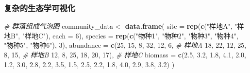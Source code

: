 \documentclass[
  twoside]{book}
\newenvironment{Shaded}{\begin{snugshade}}{\end{snugshade}}
\newcommand{\AttributeTok}[1]{\textcolor[rgb]{0.13,0.29,0.53}{#1}}
\newcommand{\CommentTok}[1]{\textcolor[rgb]{0.56,0.35,0.01}{\textit{#1}}}
\newcommand{\DecValTok}[1]{\textcolor[rgb]{0.00,0.00,0.81}{#1}}
\newcommand{\FloatTok}[1]{\textcolor[rgb]{0.00,0.00,0.81}{#1}}
\newcommand{\FunctionTok}[1]{\textcolor[rgb]{0.13,0.29,0.53}{\textbf{#1}}}
\newcommand{\NormalTok}[1]{#1}
\newcommand{\OtherTok}[1]{\textcolor[rgb]{0.56,0.35,0.01}{#1}}
\newcommand{\StringTok}[1]{\textcolor[rgb]{0.31,0.60,0.02}{#1}}
\begin{document}
\hypertarget{ux590dux6742ux7684ux751fux6001ux5b66ux53efux89c6ux5316}{%
\subsubsection{复杂的生态学可视化}\label{ux590dux6742ux7684ux751fux6001ux5b66ux53efux89c6ux5316}}

\begin{Shaded}
\begin{Highlighting}[]
\CommentTok{\# 群落组成气泡图}
\NormalTok{community\_data }\OtherTok{\textless{}{-}} \FunctionTok{data.frame}\NormalTok{(}
  \AttributeTok{site =} \FunctionTok{rep}\NormalTok{(}\FunctionTok{c}\NormalTok{(}\StringTok{"样地A"}\NormalTok{, }\StringTok{"样地B"}\NormalTok{, }\StringTok{"样地C"}\NormalTok{), }\AttributeTok{each =} \DecValTok{6}\NormalTok{),}
  \AttributeTok{species =} \FunctionTok{rep}\NormalTok{(}\FunctionTok{c}\NormalTok{(}\StringTok{"物种1"}\NormalTok{, }\StringTok{"物种2"}\NormalTok{, }\StringTok{"物种3"}\NormalTok{, }\StringTok{"物种4"}\NormalTok{, }\StringTok{"物种5"}\NormalTok{, }\StringTok{"物种6"}\NormalTok{), }\DecValTok{3}\NormalTok{),}
  \AttributeTok{abundance =} \FunctionTok{c}\NormalTok{(}\DecValTok{25}\NormalTok{, }\DecValTok{15}\NormalTok{, }\DecValTok{8}\NormalTok{, }\DecValTok{32}\NormalTok{, }\DecValTok{12}\NormalTok{, }\DecValTok{6}\NormalTok{,   }\CommentTok{\# 样地A}
                \DecValTok{18}\NormalTok{, }\DecValTok{22}\NormalTok{, }\DecValTok{12}\NormalTok{, }\DecValTok{25}\NormalTok{, }\DecValTok{8}\NormalTok{, }\DecValTok{15}\NormalTok{,  }\CommentTok{\# 样地B}
                \DecValTok{12}\NormalTok{, }\DecValTok{8}\NormalTok{, }\DecValTok{25}\NormalTok{, }\DecValTok{18}\NormalTok{, }\DecValTok{20}\NormalTok{, }\DecValTok{17}\NormalTok{), }\CommentTok{\# 样地C}
  \AttributeTok{biomass =} \FunctionTok{c}\NormalTok{(}\FloatTok{2.5}\NormalTok{, }\FloatTok{3.2}\NormalTok{, }\FloatTok{1.8}\NormalTok{, }\FloatTok{4.1}\NormalTok{, }\FloatTok{2.0}\NormalTok{, }\FloatTok{1.2}\NormalTok{,}
              \FloatTok{3.0}\NormalTok{, }\FloatTok{2.8}\NormalTok{, }\FloatTok{2.2}\NormalTok{, }\FloatTok{3.5}\NormalTok{, }\FloatTok{1.5}\NormalTok{, }\FloatTok{2.5}\NormalTok{,}
              \FloatTok{2.2}\NormalTok{, }\FloatTok{1.8}\NormalTok{, }\FloatTok{4.0}\NormalTok{, }\FloatTok{2.9}\NormalTok{, }\FloatTok{3.8}\NormalTok{, }\FloatTok{3.2}\NormalTok{)}
\NormalTok{)}


\end{Highlighting}
\end{Shaded}
\end{document}
